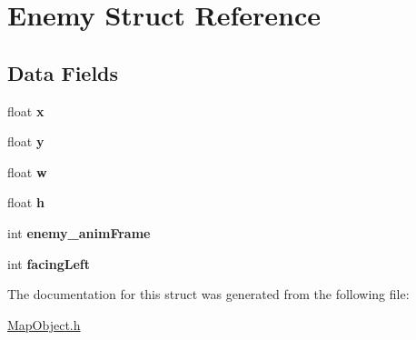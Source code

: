 \hypertarget{struct_enemy}{}\section{Enemy Struct Reference}
\label{struct_enemy}
\subsection*{Data Fields}
\begin{DoxyCompactItemize}
\item 
\hypertarget{struct_enemy_ad0da36b2558901e21e7a30f6c227a45e}{}float {\bfseries x}\label{struct_enemy_ad0da36b2558901e21e7a30f6c227a45e}

\item 
\hypertarget{struct_enemy_aa4f0d3eebc3c443f9be81bf48561a217}{}float {\bfseries y}\label{struct_enemy_aa4f0d3eebc3c443f9be81bf48561a217}

\item 
\hypertarget{struct_enemy_a56eca241e2896b9f57a79589e76fd24b}{}float {\bfseries w}\label{struct_enemy_a56eca241e2896b9f57a79589e76fd24b}

\item 
\hypertarget{struct_enemy_a85f2f1bd58b3b44ffdf3881823393959}{}float {\bfseries h}\label{struct_enemy_a85f2f1bd58b3b44ffdf3881823393959}

\item 
\hypertarget{struct_enemy_a2419a2a5316ca8ed4414e8c51cfa29b3}{}int {\bfseries enemy\+\_\+anim\+Frame}\label{struct_enemy_a2419a2a5316ca8ed4414e8c51cfa29b3}

\item 
\hypertarget{struct_enemy_a2201bf9a8f0740e580cee7927d756f7f}{}int {\bfseries facing\+Left}\label{struct_enemy_a2201bf9a8f0740e580cee7927d756f7f}

\end{DoxyCompactItemize}


The documentation for this struct was generated from the following file\+:\begin{DoxyCompactItemize}
\item 
\hyperlink{_map_object_8h}{Map\+Object.\+h}\end{DoxyCompactItemize}

